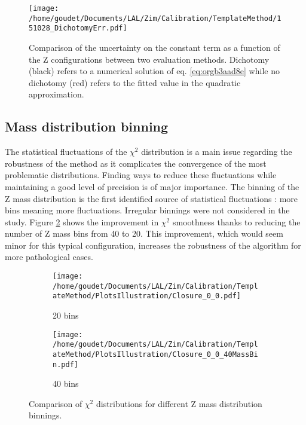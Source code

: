 \begin{figure}[htbp]
\centering
\texttt{[image: /home/goudet/Documents/LAL/Zim/Calibration/TemplateMethod/151028\_DichotomyErr.pdf]}
\caption{\label{fig:orgb6d9fd1}
  Comparison of the uncertainty on the constant term as a function of the Z configurations between two evaluation methods.
  Dichotomy (black) refers to a numerical solution of eq. \ref{eq:orgb3aad8e} while no dichotomy (red) refers to the fitted value in the quadratic approximation.}
\end{figure}


\subsection{Mass distribution binning}
\label{sec:org6eddd66}

The statistical fluctuations of the $\chi^2$ distribution is a main issue regarding the robustness of the method as it complicates the convergence of the most problematic distributions.
Finding ways to reduce these fluctuations while maintaining a good level of precision is of major importance.
The binning of the Z mass distribution is the first identified  source of statistical fluctuations : more bins meaning more fluctuations.
Irregular binnings were not considered in the study.
Figure \ref{org955c893} shows the improvement in $\chi^2$ smoothness thanks to  reducing the number of Z mass bins from 40 to 20.
This improvement, which would seem minor for this typical configuration, increases the robustness of the algorithm for more pathological cases.

\begin{figure}
\begin{subfigure}[t]{0.49\linewidth}
\begin{center}
\texttt{[image: /home/goudet/Documents/LAL/Zim/Calibration/TemplateMethod/PlotsIllustration/Closure\_0\_0.pdf]}
\end{center}
\caption{20 bins}
\end{subfigure}
\begin{subfigure}[t]{0.49\linewidth}
\begin{center}
\texttt{[image: /home/goudet/Documents/LAL/Zim/Calibration/TemplateMethod/PlotsIllustration/Closure\_0\_0\_40MassBin.pdf]}
\end{center}
\caption{40 bins}
\end{subfigure}
\caption{\label{org955c893}
Comparison of $\chi^2$ distributions for different Z mass distribution binnings.}
\end{figure}



